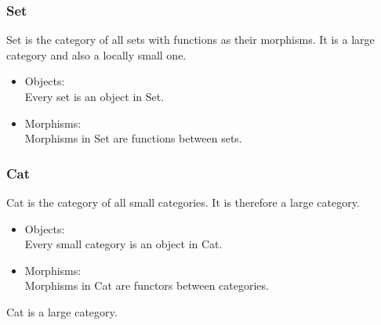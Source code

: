 \subsubsection{Set}
Set is the category of all sets with functions as their morphisms.
It is a large category and also a locally small one. \cite{nlab:set}
\begin{itemize}
  \item Objects:\\
    Every set is an object in Set.
  \item Morphisms:\\
    Morphisms in Set are functions between sets.
\end{itemize}

\subsubsection{Cat}
Cat is the category of all small categories. It is therefore a large category.
\cite{nlab:cat}
\begin{itemize}
  \item Objects:\\
    Every small category is an object in Cat.
  \item Morphisms:\\
    Morphisms in Cat are functors between categories.
\end{itemize}
Cat is a large category.
